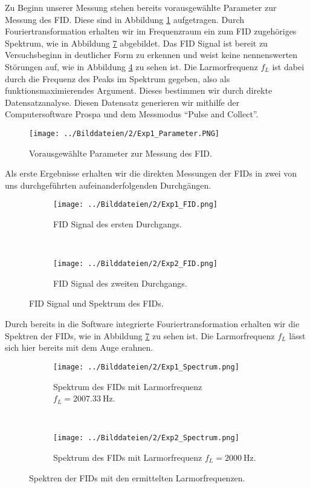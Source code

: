 \documentclass{article}
\begin{document}
    Zu Beginn unserer Messung stehen bereits vorausgewählte Parameter zur Messung des FID. Diese sind in Abbildung \ref{fig:2:Parameter} aufgetragen. Durch Fouriertransformation erhalten wir im Frequenzraum ein zum FID zugehöriges Spektrum, wie in Abbildung \ref{fig:2:Spectrum} abgebildet. Das FID Signal ist bereit zu Versuchsbeginn in deutlicher Form zu erkennen und weist keine nennenswerten Störungen auf, wie in Abbildung \ref{fig:2:FID12} zu sehen ist. Die Larmorfrequenz $f_L$ ist dabei durch die Frequenz des Peaks im Spektrum gegeben, also als funktionsmaximierendes Argument. Dieses bestimmen wir durch direkte Datensatzanalyse. Diesen Datensatz generieren wir mithilfe der Computersoftware Prospa und dem Messmodus \enquote{Pulse and Collect}. 
    \begin{figure}[H]
        \centering
        \texttt{[image: ../Bilddateien/2/Exp1\_Parameter.PNG]}
        \caption{Vorausgewählte Parameter zur Messung des FID.}
        \label{fig:2:Parameter}
    \end{figure}
    Als erste Ergebnisse erhalten wir die direkten Messungen der FIDs in zwei von uns durchgeführten aufeinanderfolgenden Durchgängen.
    \begin{figure}[H]
        \centering
        \begin{subfigure}[b]{0.4\textwidth}
            \texttt{[image: ../Bilddateien/2/Exp1\_FID.png]}
            \caption{FID Signal des ersten Durchgangs.}
            \label{fig:2:FID1}
        \end{subfigure}
        \
        \begin{subfigure}[b]{0.4\textwidth}
            \texttt{[image: ../Bilddateien/2/Exp2\_FID.png]}
            \caption{FID Signal des zweiten Durchgangs.}
            \label{fig:2:FID2}
        \end{subfigure}
        \caption{FID Signal und Spektrum des FIDs.}
        \label{fig:2:FID12}
    \end{figure}
    Durch bereits in die Software integrierte Fouriertransformation erhalten wir die Spektren der FIDs, wie in Abbildung \ref{fig:2:Spectrum} zu sehen ist. Die Larmorfrequenz $f_L$ lässt sich hier bereits mit dem Auge erahnen.
    \begin{figure}[H]
        \centering
        \begin{subfigure}[b]{0.4\textwidth}
            \texttt{[image: ../Bilddateien/2/Exp1\_Spectrum.png]}
            \caption{Spektrum des FIDs mit Larmorfrequenz $f_L = \SI{2007.33}{\hertz}$.}
            \label{fig:2:Spectrum-1}
        \end{subfigure}
        \
        \begin{subfigure}[b]{0.4\textwidth}
            \texttt{[image: ../Bilddateien/2/Exp2\_Spectrum.png]}
            \caption{Spektrum des FIDs mit Larmorfrequenz $f_L = \SI{2000}{\hertz}$.}
            \label{fig:2:Spectrum-2}
        \end{subfigure}
        \caption{Spektren der FIDs mit den ermittelten Larmorfrequenzen.}
        \label{fig:2:Spectrum}
    \end{figure}
\end{document}
